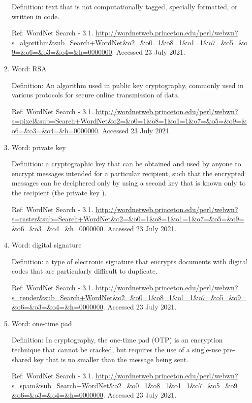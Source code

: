 \documentclass{scrartcl}
\begin{document}
\begin{enumerate}
Definition:  text that is not computationally tagged, specially formatted, or written in code.

Ref: WordNet Search - 3.1. \url{http://wordnetweb.princeton.edu/perl/webwn?s=algorithm\&sub=Search+WordNet\&o2=\&o0=1\&o8=1\&o1=1\&o7=\&o5=\&o9=\&o6=\&o3=\&o4=\&h=0000000}. Accessed 23 July 2021.

\item Word: RSA

Definition:   An algorithm used in public key cryptography, commonly used in various protocols for secure online transmission of data.

Ref: WordNet Search - 3.1. \url{http://wordnetweb.princeton.edu/perl/webwn?s=pixel\&sub=Search+WordNet\&o2=\&o0=1\&o8=1\&o1=1\&o7=\&o5=\&o9=\&o6=\&o3=\&o4=\&h=0000000}. Accessed 23 July 2021.

\item Word: private key

Definition: a cryptographic key that can be obtained and used by anyone to encrypt messages intended for a particular recipient, such that the encrypted messages can be deciphered only by using a second key that is known only to the recipient (the private key ).

Ref: WordNet Search - 3.1. \url{http://wordnetweb.princeton.edu/perl/webwn?s=raster\&sub=Search+WordNet\&o2=\&o0=1\&o8=1\&o1=1\&o7=\&o5=\&o9=\&o6=\&o3=\&o4=\&h=0000000}. Accessed 23 July 2021.

\item Word: digital signature

Definition: a type of electronic signature that encrypts documents with digital codes that are particularly difficult to duplicate.

Ref: WordNet Search - 3.1. \url{http://wordnetweb.princeton.edu/perl/webwn?s=render\&sub=Search+WordNet\&o2=\&o0=1\&o8=1\&o1=1\&o7=\&o5=\&o9=\&o6=\&o3=\&o4=\&h=0000000}. Accessed 23 July 2021.

\item Word: one-time pad

Definition:  In cryptography, the one-time pad (OTP) is an encryption technique that cannot be cracked, but requires the use of a single-use pre-shared key that is no smaller than the message being sent.

Ref: WordNet Search - 3.1. \url{http://wordnetweb.princeton.edu/perl/webwn?s=spam\&sub=Search+WordNet\&o2=\&o0=1\&o8=1\&o1=1\&o7=\&o5=\&o9=\&o6=\&o3=\&o4=\&h=0000000}. Accessed 23 July 2021.
\end{enumerate}
\end{document}
